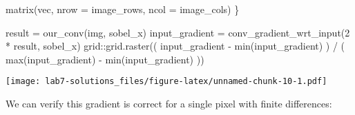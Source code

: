 \documentclass[
  a4paper,
]{article}
\newenvironment{Shaded}{\begin{snugshade}}{\end{snugshade}}
\newcommand{\AttributeTok}[1]{\textcolor[rgb]{0.77,0.63,0.00}{#1}}
\newcommand{\DecValTok}[1]{\textcolor[rgb]{0.00,0.00,0.81}{#1}}
\newcommand{\FunctionTok}[1]{\textcolor[rgb]{0.00,0.00,0.00}{#1}}
\newcommand{\NormalTok}[1]{#1}
\newcommand{\OtherTok}[1]{\textcolor[rgb]{0.56,0.35,0.01}{#1}}
\newcommand{\SpecialCharTok}[1]{\textcolor[rgb]{0.00,0.00,0.00}{#1}}
\begin{document}
\begin{Shaded}
\begin{Highlighting}[]
  \FunctionTok{matrix}\NormalTok{(vec, }\AttributeTok{nrow =}\NormalTok{ image\_rows, }\AttributeTok{ncol =}\NormalTok{ image\_cols)}
\NormalTok{\}}


\NormalTok{result }\OtherTok{=} \FunctionTok{our\_conv}\NormalTok{(img, sobel\_x)}
\NormalTok{input\_gradient }\OtherTok{=} \FunctionTok{conv\_gradient\_wrt\_input}\NormalTok{(}\DecValTok{2} \SpecialCharTok{*}\NormalTok{ result, sobel\_x)}
\NormalTok{grid}\SpecialCharTok{::}\FunctionTok{grid.raster}\NormalTok{((}
\NormalTok{  input\_gradient }\SpecialCharTok{{-}} \FunctionTok{min}\NormalTok{(input\_gradient)}
\NormalTok{) }\SpecialCharTok{/}\NormalTok{ (}
  \FunctionTok{max}\NormalTok{(input\_gradient) }\SpecialCharTok{{-}} \FunctionTok{min}\NormalTok{(input\_gradient)}
\NormalTok{))}
\end{Highlighting}
\end{Shaded}

\texttt{[image: lab7-solutions\_files/figure-latex/unnamed-chunk-10-1.pdf]}

We can verify this gradient is correct for a single pixel with finite
differences:
\end{document}
